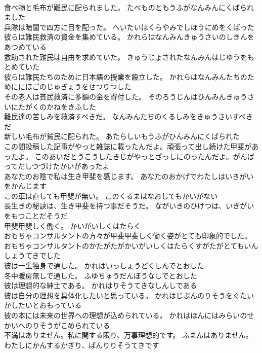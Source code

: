 \documentclass[8pt]{extreport}
\begin{document}
\begin{CJK}{UTF8}{min}
\\	食べ物と毛布が難民に配られました。	たべものともうふがなんみんにくばられました 
\\	兵隊は暗闇で四方に目を配った。	へいたいはくらやみでしほうにめをくばった 
\\	彼らは難民救済の資金を集めている。	かれらはなんみんきゅうさいのしきんをあつめている 
\\	救助された難民は自由を求めていた。	きゅうじょされたなんみんはじゆうをもとめていた 
\\	彼らは難民たちのために日本語の授業を設立した。	かれらはなんみんたちのためににほごのじゅぎょうをせつりつした 
\\	その老人は貧民救済に多額の金を寄付した。	そのろうじんはひんみんきゅうさいにたがくのかねをきふした 
\\	難民達の苦しみを救済すべきだ。	なんみんたちのくるしみをきゅうさいすべきだ 
\\	新しい毛布が貧民に配られた。	あたらしいもうふがひんみんにくばられた 
\\	この間投稿した記事がやっと雑誌に載ったんだよ。頑張って出し続けた甲斐があったよ。	このあいだとうこうしたきじがやっとざっしにのったんだよ。がんばってだしつづけたかいがあったよ 
\\	あなたのお陰で私は生き甲斐を感じます。	あなたのおかげでわたしはいきがいをかんじます 
\\	この車は直しても甲斐が無い。	このくるまはなおしてもかいがない 
\\	長生きの秘訣は、生き甲斐を持つ事だそうだ。	ながいきのひけつは、いきがいをもつことだそうだ 
\\	甲斐甲斐しく働く。	かいがいしくはたらく 
\\	おもちゃコンサルタントの方々が甲斐甲斐しく働く姿がとても印象的でした。	おもちゃコンサルタントのかたがたがかいがいしくはたらくすがたがとてもいんしょうてきでした 
\\	彼は一生独身で通した。	かれはいっしょうどくしんでとおした 
\\	冬中暖房無しで通した。	ふゆちゅうだんぼうなしでとおした 
\\	彼は理想的な紳士である。	かれはりそうてきなしんしである 
\\	彼は自分の理想を具体化したいと思っている。	かれはじぶんのりそうをぐたいかしたいとおもっている 
\\	彼の本には未来の世界への理想が込められている。	かれはほんにはみらいのせかいへのりそうがこめられている 
\\	不満はありません。私に関する限り、万事理想的です。	ふまんはありません。わたしにかんするかぎり、ばんりりそうてきです 

\end{CJK}
\end{document}
